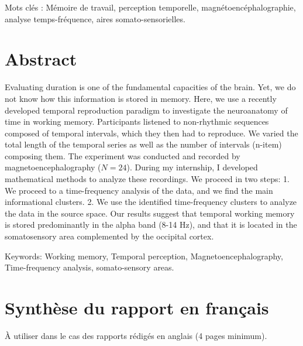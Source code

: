 Mots clés :
Mémoire de travail, perception temporelle, magnétoencéphalographie, analyse temps-fréquence, aires somato-sensorielles.
\chapter*{\centering Abstract}

Evaluating duration is one of the fundamental capacities of the brain. Yet, we do not know how this information is stored in memory. Here, we use a recently developed temporal reproduction paradigm to investigate the neuroanatomy of time in working memory. Participants listened to non-rhythmic sequences composed of temporal intervals, which they then had to reproduce. We varied the total length of the temporal series as well as the number of intervals (n-item) composing them. The experiment was conducted and recorded by magnetoencephalography ($N=24$). During my internship, I developed mathematical methods to analyze these recordings. We proceed in two steps: 1. We proceed to a time-frequency analysis of the data, and we find the main informational clusters. 2. We use the identified time-frequency clusters to analyze the data in the source space. Our results suggest that temporal working memory is stored predominantly in the alpha band (8-14 Hz), and that it is located in the somatosensory area complemented by the occipital cortex.

Keywords:
Working memory, Temporal perception, Magnetoencephalography, Time-frequency analysis, somato-sensory areas.

\chapter*{\centering Synthèse du rapport en français}

À utiliser dans le cas des rapports rédigés en anglais (4 pages minimum).
